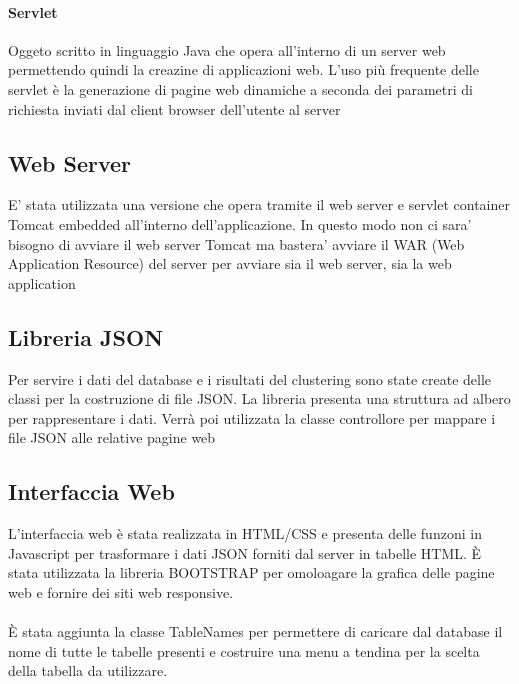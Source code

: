 \documentclass{article}
\begin{document}
        \paragraph{Servlet}
        Oggeto scritto in linguaggio Java che opera all'interno di
        un server web permettendo quindi la creazine di applicazioni web. L'uso 
        più frequente delle servlet è la generazione di pagine web dinamiche a 
        seconda dei parametri di richiesta inviati dal client browser 
        dell'utente al server
    
        \subsection{Web Server}
        E' stata utilizzata una versione che opera tramite il web server e 
        servlet container Tomcat embedded all'interno dell'applicazione. 
        In questo modo non ci sara' bisogno di avviare il web server Tomcat ma 
        bastera' avviare il WAR (Web Application Resource) del server per 
        avviare sia il web server, sia la web application

        \subsection{Libreria JSON}
        Per servire i dati del database e i risultati del clustering sono state
        create delle classi per la costruzione di file JSON. La libreria
        presenta una struttura ad albero per rappresentare i dati. Verrà poi 
        utilizzata la classe controllore per mappare i file JSON alle relative 
        pagine web

        \subsection{Interfaccia Web}
        L'interfaccia web è stata realizzata in HTML/CSS e presenta delle funzoni 
        in Javascript per trasformare i dati JSON forniti dal server in tabelle
        HTML.  È  stata utilizzata la libreria BOOTSTRAP per omoloagare la 
        grafica delle pagine web e fornire dei siti web responsive. \\\\
        È stata aggiunta la classe TableNames 
        per permettere di caricare dal database il nome di tutte le tabelle
        presenti e costruire una menu a tendina per la scelta della tabella da 
        utilizzare.
\end{document}
